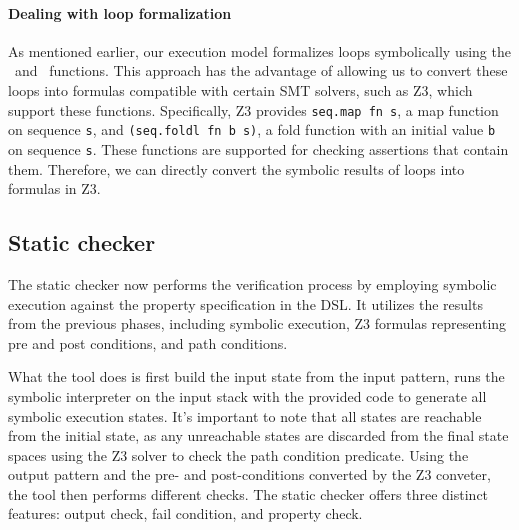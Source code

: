 \documentclass[a4paper,UKenglish,cleveref, autoref, thm-restate]{lipics-v2021}
\begin{document}
\paragraph{Dealing with loop formalization}
As mentioned earlier, our execution model formalizes loops symbolically using the \FOLD\ and \FMAP\ functions. This approach has the advantage of allowing us to convert these loops into formulas compatible with certain SMT solvers, such as Z3, which support these functions. Specifically, Z3 provides \lstinline/seq.map fn s/, a map function on sequence \lstinline/s/, and \lstinline/(seq.foldl fn b s)/, a fold function with an initial value \lstinline/b/ on sequence \lstinline/s/. These functions are supported for checking assertions that contain them. Therefore, we can directly convert the symbolic results of loops into formulas in Z3.
\subsection{Static checker}
The static checker now performs the verification process by employing symbolic execution against the property specification in the DSL. It utilizes the results from the previous phases, including symbolic execution, Z3 formulas representing pre and post conditions, and path conditions. 

What the tool does is first build the input state from the input pattern, runs the symbolic interpreter on the input stack with the provided code to generate all symbolic execution states. It's important to note that all states are reachable from the initial state, as any unreachable states are discarded from the final state spaces using the Z3 solver to check the path condition predicate. Using the output pattern and the pre- and post-conditions converted by the Z3 conveter, the tool then performs different checks. The static checker offers three distinct features: output check, fail condition, and property check.
\end{document}
